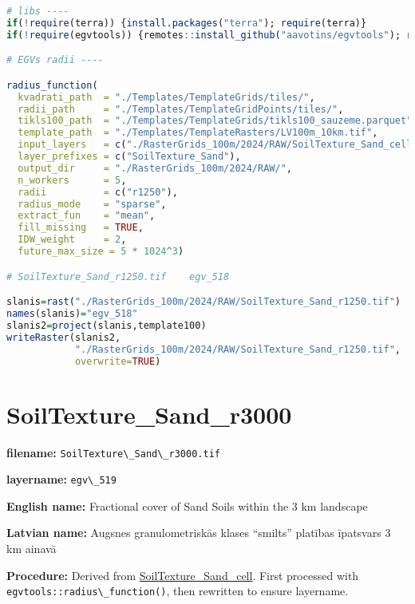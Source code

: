 \documentclass[
]{book}
\newcommand{\passthrough}[1]{#1}
\begin{document}
\begin{lstlisting}[language=R]
# libs ----
if(!require(terra)) {install.packages("terra"); require(terra)}
if(!require(egvtools)) {remotes::install_github("aavotins/egvtools"); require(egvtools)}

# EGVs radii ----

radius_function(
  kvadrati_path  = "./Templates/TemplateGrids/tiles/",
  radii_path     = "./Templates/TemplateGridPoints/tiles/",
  tikls100_path  = "./Templates/TemplateGrids/tikls100_sauzeme.parquet",
  template_path  = "./Templates/TemplateRasters/LV100m_10km.tif",
  input_layers   = c("./RasterGrids_100m/2024/RAW/SoilTexture_Sand_cell.tif"),
  layer_prefixes = c("SoilTexture_Sand"),
  output_dir     = "./RasterGrids_100m/2024/RAW/",
  n_workers      = 5,
  radii          = c("r1250"),
  radius_mode    = "sparse",
  extract_fun    = "mean",
  fill_missing   = TRUE,
  IDW_weight     = 2,
  future_max_size = 5 * 1024^3)

# SoilTexture_Sand_r1250.tif    egv_518

slanis=rast("./RasterGrids_100m/2024/RAW/SoilTexture_Sand_r1250.tif")
names(slanis)="egv_518"
slanis2=project(slanis,template100)
writeRaster(slanis2,
            "./RasterGrids_100m/2024/RAW/SoilTexture_Sand_r1250.tif",
            overwrite=TRUE)
\end{lstlisting}

\section{SoilTexture\_Sand\_r3000}\label{ch06.519}

\textbf{filename:} \passthrough{\lstinline!SoilTexture\_Sand\_r3000.tif!}

\textbf{layername:} \passthrough{\lstinline!egv\_519!}

\textbf{English name:} Fractional cover of Sand Soils within the 3 km landscape

\textbf{Latvian name:} Augsnes granulometriskās klases ``smilts'' platības īpatsvars 3 km ainavā

\textbf{Procedure:} Derived from \hyperref[ch06.516]{SoilTexture\_Sand\_cell}. First processed
with \passthrough{\lstinline!egvtools::radius\_function()!}, then rewritten to ensure layername.
\end{document}
